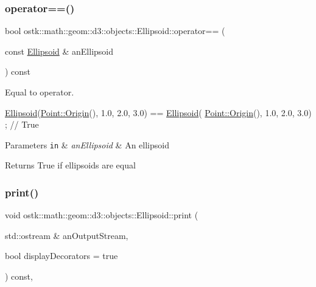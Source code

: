 \subsubsection{\texorpdfstring{operator==()}{operator==()}}
{\footnotesize\ttfamily bool ostk\+::math\+::geom\+::d3\+::objects\+::\+Ellipsoid\+::operator== (\begin{DoxyParamCaption}\item[{const \hyperlink{classostk_1_1math_1_1geom_1_1d3_1_1objects_1_1_ellipsoid}{Ellipsoid} \&}]{an\+Ellipsoid }\end{DoxyParamCaption}) const}



Equal to operator. 


\begin{DoxyCode}
\hyperlink{classostk_1_1math_1_1geom_1_1d3_1_1objects_1_1_ellipsoid_acd84276f65a14db12623402a411712b7}{Ellipsoid}(\hyperlink{classostk_1_1math_1_1geom_1_1d3_1_1objects_1_1_point_a079c199f08b015d456d02728a71b534c}{Point::Origin}(), 1.0, 2.0, 3.0) == \hyperlink{classostk_1_1math_1_1geom_1_1d3_1_1objects_1_1_ellipsoid_acd84276f65a14db12623402a411712b7}{Ellipsoid}(
      \hyperlink{classostk_1_1math_1_1geom_1_1d3_1_1objects_1_1_point_a079c199f08b015d456d02728a71b534c}{Point::Origin}(), 1.0, 2.0, 3.0) ; \textcolor{comment}{// True}
\end{DoxyCode}



\begin{DoxyParams}[1]{Parameters}
\mbox{\tt in}  & {\em an\+Ellipsoid} & An ellipsoid \\
\hline
\end{DoxyParams}
\begin{DoxyReturn}{Returns}
True if ellipsoids are equal 
\end{DoxyReturn}
\mbox{\label{classostk_1_1math_1_1geom_1_1d3_1_1objects_1_1_ellipsoid_a650fa20181d61ea455b98fc3330baf6e}} 
\subsubsection{\texorpdfstring{print()}{print()}}
{\footnotesize\ttfamily void ostk\+::math\+::geom\+::d3\+::objects\+::\+Ellipsoid\+::print (\begin{DoxyParamCaption}\item[{std\+::ostream \&}]{an\+Output\+Stream,  }\item[{bool}]{display\+Decorators = {\ttfamily true} }\end{DoxyParamCaption}) const\hspace{0.3cm}{\ttfamily [override]}, {\ttfamily [virtual]}}



